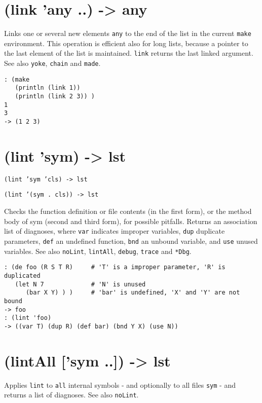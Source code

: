 {{{{{{ 
\section{(link 'any ..) -> any}
\label{sec-8-1-12-15}


Links one or several new elements \texttt{any} to the end of the list in the
current \texttt{make} environment. This operation is efficient also for long
lists, because a pointer to the last element of the list is maintained.
\texttt{link} returns the last linked argument. See also \texttt{yoke}, \texttt{chain} and
\texttt{made}.


\begin{verbatim}
: (make
   (println (link 1))
   (println (link 2 3)) )
1
3
-> (1 2 3)
\end{verbatim}

 
\section{(lint 'sym) -> lst}
\label{sec-8-1-12-16}


\texttt{(lint 'sym 'cls) -> lst}

\texttt{(lint '(sym . cls)) -> lst}

Checks the function definition or file contents (in the first form), or
the method body of sym (second and third form), for possible pitfalls.
Returns an association list of diagnoses, where \texttt{var} indicates improper
variables, \texttt{dup} duplicate parameters, \texttt{def} an undefined function,
\texttt{bnd} an unbound variable, and \texttt{use} unused variables. See also
\texttt{noLint}, \texttt{lintAll}, \texttt{debug}, \texttt{trace} and \texttt{*Dbg}.


\begin{verbatim}
: (de foo (R S T R)     # 'T' is a improper parameter, 'R' is duplicated
   (let N 7             # 'N' is unused
      (bar X Y) ) )     # 'bar' is undefined, 'X' and 'Y' are not bound
-> foo
: (lint 'foo)
-> ((var T) (dup R) (def bar) (bnd Y X) (use N))
\end{verbatim}

 
\section{(lintAll ['sym ..]) -> lst}
\label{sec-8-1-12-17}


Applies \texttt{lint} to \texttt{all} internal symbols - and optionally to all files
\texttt{sym} - and returns a list of diagnoses. See also \texttt{noLint}.


}}}}}}
